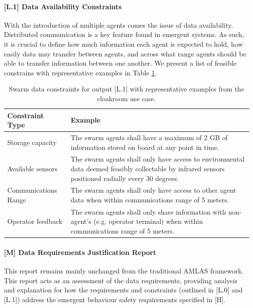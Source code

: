 \documentclass[lettersize,journal]{IEEEtran}
\begin{document}
\paragraph*{[L.1] Data Availability Constraints}

With the introduction of multiple agents comes the issue of data availability. Distributed communication is a key feature found in emergent systems. As such, it is crucial to define how much information each agent is expected to hold, how easily data may transfer between agents, and across what range agents should be able to transfer information between one another. We present a list of feasible constrains with representative examples in Table \ref{tab:constraints}.

\begin{table}[H]
    \centering
    \begin{tabular}{p{2cm} p{6cm}}
         \textbf{Constraint Type} & \textbf{Example}  \\
         \hline
         Storage capacity & The swarm agents shall have a maximum of 2 GB of information stored on board at any point in time. \\
         \hline
         Available sensors & The swarm agents shall only have access to environmental data deemed feasibly collectable by infrared sensors positioned radially every 30 degrees. \\
         \hline
         Communications Range & The swarm agents shall only have access to other agent data when within communications range of 5 meters. \\
         \hline
         Operator feedback & The swarm agents shall only share information with non-agent’s (e.g. operator terminal) when within communications range of 5 meters.
    \end{tabular}
    \caption{Swarm data constraints for output [L.1] with representative examples from the cloakroom use case.}
    \label{tab:constraints}
\end{table}

\paragraph*{[M] Data Requirements Justification Report}

This report remains mainly unchanged from the traditional AMLAS framework. This report acts as an assessment of the data requirements, providing analysis and explanation for how the requirements and constraints (outlined in [L.0] and [L.1]) address the emergent behaviour safety requirements specified in [H].
\end{document}
